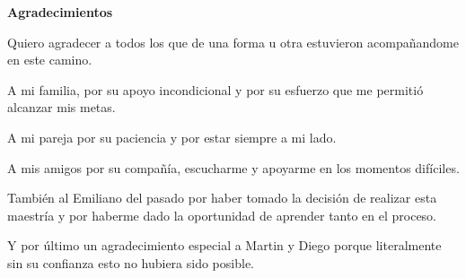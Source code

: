 \thispagestyle{empty}

\begin{center}
    \Large\bfseries Agradecimientos
\end{center}
\vspace{1cm}

Quiero agradecer a todos los que de una forma u otra estuvieron acompañandome en este camino.\newline

A mi familia, por su apoyo incondicional y por su esfuerzo que me permitió alcanzar mis metas.\newline

A mi pareja por su paciencia y por estar siempre a mi lado. \newline

A mis amigos por su compañía, escucharme y apoyarme en los momentos difíciles. \newline

También al Emiliano del pasado por haber tomado la decisión de 
realizar esta maestría y por haberme dado la oportunidad de aprender tanto en el proceso. \newline

Y por último un agradecimiento especial a Martin y Diego porque 
literalmente sin su confianza esto no hubiera sido posible.
\newpage